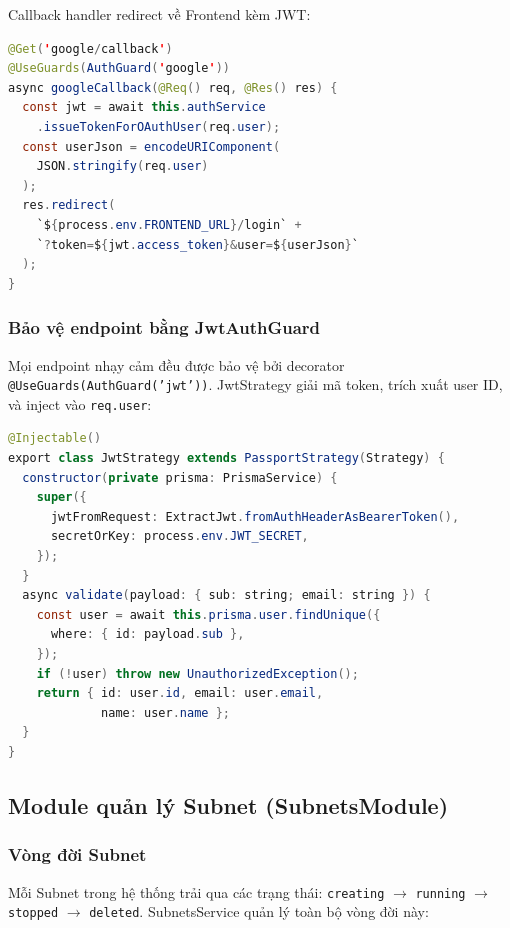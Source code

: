 Callback handler redirect về Frontend kèm JWT:

\begin{lstlisting}[caption={AuthController --- Google OAuth callback}, label={lst:google_callback}, language=Java]
@Get('google/callback')
@UseGuards(AuthGuard('google'))
async googleCallback(@Req() req, @Res() res) {
  const jwt = await this.authService
    .issueTokenForOAuthUser(req.user);
  const userJson = encodeURIComponent(
    JSON.stringify(req.user)
  );
  res.redirect(
    `${process.env.FRONTEND_URL}/login` +
    `?token=${jwt.access_token}&user=${userJson}`
  );
}
\end{lstlisting}

\subsubsection{Bảo vệ endpoint bằng JwtAuthGuard}

Mọi endpoint nhạy cảm đều được bảo vệ bởi decorator \texttt{@UseGuards(AuthGuard('jwt'))}. JwtStrategy giải mã token, trích xuất user ID, và inject vào \texttt{req.user}:

\begin{lstlisting}[caption={JwtStrategy --- Xác minh JWT token}, label={lst:jwt_strategy}, language=Java]
@Injectable()
export class JwtStrategy extends PassportStrategy(Strategy) {
  constructor(private prisma: PrismaService) {
    super({
      jwtFromRequest: ExtractJwt.fromAuthHeaderAsBearerToken(),
      secretOrKey: process.env.JWT_SECRET,
    });
  }
  async validate(payload: { sub: string; email: string }) {
    const user = await this.prisma.user.findUnique({
      where: { id: payload.sub },
    });
    if (!user) throw new UnauthorizedException();
    return { id: user.id, email: user.email,
             name: user.name };
  }
}
\end{lstlisting}


\subsection{Module quản lý Subnet (SubnetsModule)}

\subsubsection{Vòng đời Subnet}

Mỗi Subnet trong hệ thống trải qua các trạng thái: \texttt{creating} $\rightarrow$ \texttt{running} $\rightarrow$ \texttt{stopped} $\rightarrow$ \texttt{deleted}. SubnetsService quản lý toàn bộ vòng đời này:


